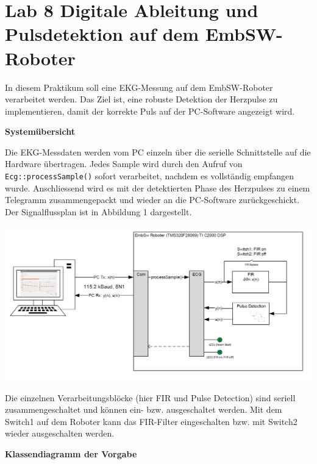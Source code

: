 \section{Lab 8 Digitale Ableitung und Pulsdetektion auf dem EmbSW-Roboter}
In diesem Praktikum soll eine EKG-Messung auf dem EmbSW-Roboter verarbeitet werden. Das Ziel ist, eine robuste Detektion der Herzpulse zu implementieren, damit der korrekte Puls auf der PC-Software angezeigt wird.

\medskip
\textbf{Systemübersicht}
\medskip

Die EKG-Messdaten werden vom PC einzeln über die serielle Schnittstelle auf die Hardware übertragen. Jedes Sample wird durch den Aufruf von \texttt{Ecg::processSample()} sofort verarbeitet, nachdem es vollständig empfangen wurde. Anschliessend wird es mit der detektierten Phase des Herzpulses zu einem Telegramm zusammengepackt und wieder an die PC-Software zurückgeschickt. Der Signalflussplan ist in Abbildung 1 dargestellt.

\begin{center}
  \includegraphics[width=.8\linewidth]{900-Praktika/prak08/1.PNG}
\end{center}

Die einzelnen Verarbeitungsblöcke (hier FIR und Pulse Detection) sind seriell zusammengeschaltet und können ein- bzw. ausgeschaltet werden. Mit dem Switch1 auf dem Roboter kann das FIR-Filter eingeschalten bzw. mit Switch2 wieder ausgeschalten werden.

\medskip
\textbf{Klassendiagramm der Vorgabe}

